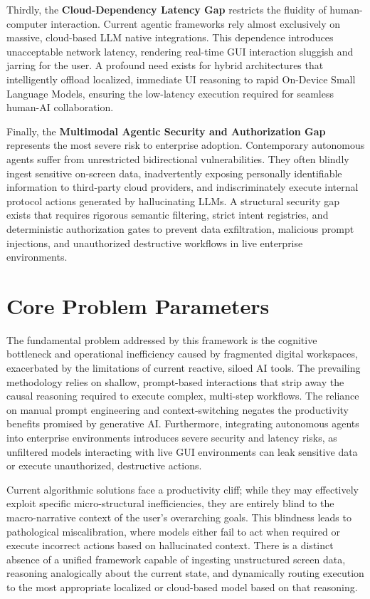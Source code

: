 \documentclass[12pt, a4paper]{report}
\begin{document}
Thirdly, the \textbf{Cloud-Dependency Latency Gap} restricts the fluidity of human-computer interaction. Current agentic frameworks rely almost exclusively on massive, cloud-based LLM native integrations.\cite{hojo2025} This dependence introduces unacceptable network latency, rendering real-time GUI interaction sluggish and jarring for the user. A profound need exists for hybrid architectures that intelligently offload localized, immediate UI reasoning to rapid On-Device Small Language Models, ensuring the low-latency execution required for seamless human-AI collaboration.\cite{hojo2025}

Finally, the \textbf{Multimodal Agentic Security and Authorization Gap} represents the most severe risk to enterprise adoption. Contemporary autonomous agents suffer from unrestricted bidirectional vulnerabilities.\cite{hojo2025} They often blindly ingest sensitive on-screen data, inadvertently exposing personally identifiable information to third-party cloud providers, and indiscriminately execute internal protocol actions generated by hallucinating LLMs.\cite{hojo2025} A structural security gap exists that requires rigorous semantic filtering, strict intent registries, and deterministic authorization gates to prevent data exfiltration, malicious prompt injections, and unauthorized destructive workflows in live enterprise environments.\cite{hojo2025}


\chapter{Core Problem Parameters}

The fundamental problem addressed by this framework is the cognitive bottleneck and operational inefficiency caused by fragmented digital workspaces, exacerbated by the limitations of current reactive, siloed AI tools. The prevailing methodology relies on shallow, prompt-based interactions that strip away the causal reasoning required to execute complex, multi-step workflows. The reliance on manual prompt engineering and context-switching negates the productivity benefits promised by generative AI. Furthermore, integrating autonomous agents into enterprise environments introduces severe security and latency risks, as unfiltered models interacting with live GUI environments can leak sensitive data or execute unauthorized, destructive actions.

Current algorithmic solutions face a productivity cliff; while they may effectively exploit specific micro-structural inefficiencies, they are entirely blind to the macro-narrative context of the user's overarching goals. This blindness leads to pathological miscalibration, where models either fail to act when required or execute incorrect actions based on hallucinated context. There is a distinct absence of a unified framework capable of ingesting unstructured screen data, reasoning analogically about the current state, and dynamically routing execution to the most appropriate localized or cloud-based model based on that reasoning.
\end{document}
